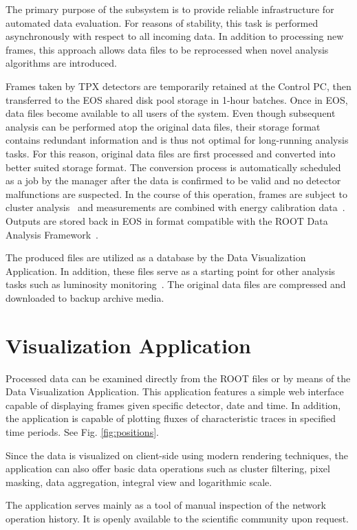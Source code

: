 \documentclass[journal]{IEEEtran}
\begin{document}
The primary purpose of the subsystem is to provide reliable infrastructure for automated data evaluation. For reasons of stability, this task is performed asynchronously with respect to all incoming data. In addition to processing new frames, this approach allows data files to be reprocessed when novel analysis algorithms are introduced.

Frames taken by TPX detectors are temporarily retained at the Control PC, then transferred to the EOS shared disk pool storage in 1-hour batches. Once in EOS, data files become available to all users of the system. Even though subsequent analysis can be performed atop the original data files, their storage format contains redundant information and is thus not optimal for long-running analysis tasks. For this reason, original data files are first processed and converted into better suited storage format. The conversion process is automatically scheduled as a job by the manager after the data is confirmed to be valid and no detector malfunctions are suspected. In the course of this operation, frames are subject to cluster analysis~\cite{Holy2008} and measurements are combined with energy calibration data~\cite{Jakubek2011}. Outputs are stored back in EOS in format compatible with the ROOT Data Analysis Framework~\cite{ROOT}.

The produced files are utilized as a database by the Data Visualization Application. In addition, these files serve as a starting point for other analysis tasks such as luminosity monitoring~\cite{Sopczak2017}. The original data files are compressed and downloaded to backup archive media.

\section{\label{sec:dal}Visualization Application}
Processed data can be examined directly from the ROOT files or by means of the Data Visualization Application. \cite{Manek2016} This application features a simple web interface capable of displaying frames given specific detector, date and time. In addition, the application is capable of plotting fluxes of characteristic traces in specified time periods. See Fig. \ref{fig:positions}.

Since the data is visualized on client-side using modern rendering techniques, the application can also offer basic data operations such as cluster filtering, pixel masking, data aggregation, integral view and logarithmic scale.

The application serves mainly as a tool of manual inspection of the network operation history. It is openly available to the scientific community upon request.
\end{document}
